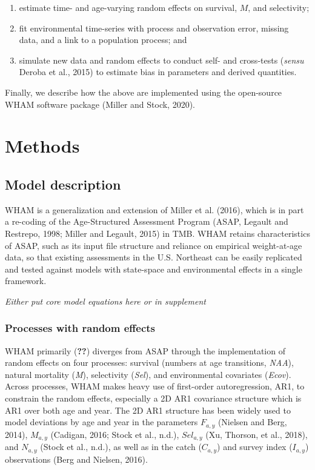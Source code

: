 \documentclass[]{article}
\providecommand{\tightlist}{%
  \setlength{\itemsep}{0pt}\setlength{\parskip}{0pt}}
\begin{document}
\begin{enumerate}
\def\labelenumi{\arabic{enumi}.}
\tightlist
\item
  estimate time- and age-varying random effects on survival, \(M\), and
  selectivity;
\item
  fit environmental time-series with process and observation error,
  missing data, and a link to a population process; and
\item
  simulate new data and random effects to conduct self- and cross-tests
  (\emph{sensu} Deroba et al., 2015) to estimate bias in parameters and
  derived quantities.
\end{enumerate}

Finally, we describe how the above are implemented using the open-source
WHAM software package (Miller and Stock, 2020).

\hypertarget{methods}{%
\section{Methods}\label{methods}}

\hypertarget{model-description}{%
\subsection{Model description}\label{model-description}}

WHAM is a generalization and extension of Miller et al. (2016), which is
in part a re-coding of the Age-Structured Assessment Program (ASAP,
Legault and Restrepo, 1998; Miller and Legault, 2015) in TMB. WHAM
retains characteristics of ASAP, such as its input file structure and
reliance on empirical weight-at-age data, so that existing assessments
in the U.S. Northeast can be easily replicated and tested against models
with state-space and environmental effects in a single framework.

\emph{Either put core model equations here or in supplement}

\hypertarget{processes-with-random-effects}{%
\subsubsection{Processes with random
effects}\label{processes-with-random-effects}}

WHAM primarily (\textbf{??}) diverges from ASAP through the
implementation of random effects on four processes: survival (numbers at
age transitions, \emph{NAA}), natural mortality (\emph{M}), selectivity
(\emph{Sel}), and environmental covariates (\emph{Ecov}). Across
processes, WHAM makes heavy use of first-order autoregression, AR1, to
constrain the random effects, especially a 2D AR1 covariance structure
which is AR1 over both age and year. The 2D AR1 structure has been
widely used to model deviations by age and year in the parameters
\(F_{a,y}\) (Nielsen and Berg, 2014), \(M_{a,y}\) (Cadigan, 2016; Stock
et al., n.d.), \(Sel_{a,y}\) (Xu, Thorson, et al., 2018), and
\(N_{a,y}\) (Stock et al., n.d.), as well as in the catch (\(C_{a,y}\))
and survey index (\(I_{a,y}\)) observations (Berg and Nielsen, 2016).
\end{document}
